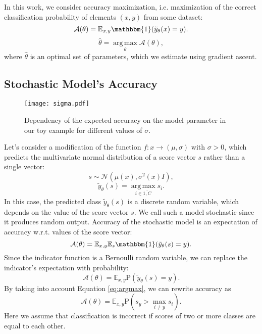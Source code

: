 \documentclass[nohyperref]{article}
\DeclareMathOperator*{\argmax}{arg\,max}
\theoremstyle{plain}
\theoremstyle{definition}
\theoremstyle{remark}
\begin{document}
In this work, we consider accuracy maximization, i.e. maximization of the correct classification probability of elements $(x, y)$ from some dataset:
\begin{equation}
    \mathcal{A}(\theta) = \mathbb{E}_{x, y}\mathbbm{1}(\tilde{y}_\theta(x) = y).
\end{equation}
\begin{equation}
    \hat{\theta} = \argmax\limits_\theta \mathcal{A}(\theta),
\end{equation}
where $\hat{\theta}$ is an optimal set of parameters, which we estimate using gradient ascent.

\subsection{Stochastic Model's Accuracy}


\begin{figure}[t]
\vskip 0.1in
\centering
\texttt{[image: sigma.pdf]}
\caption{Dependency of the expected accuracy on the model parameter in our toy example for different values of $\sigma$.}
\label{fig:sigma}
\vskip -0.1in
\end{figure}

Let's consider a modification of the function $f: x \rightarrow (\mu, \sigma)$ with $\sigma > 0$, which predicts the multivariate normal distribution of a score vector $s$ rather than a single vector:
\begin{equation}
    s \sim \mathcal{N}(\mu(x), \sigma^2(x) I),
    \label{eq:scores-distribution}
\end{equation}
\begin{equation}
    \tilde{y}_\theta(s) = \argmax\limits_{i \in \overline{1, C}} s_i.
    \label{eq:argmax}
\end{equation}
In this case, the predicted class $\tilde{y}_\theta(s)$ is a discrete random variable, which depends on the value of the score vector $s$. We call such a model stochastic since it produces random output. Accuracy of the stochastic model is an expectation of accuracy w.r.t. values of the score vector:
\begin{equation}
    \mathcal{A}(\theta) = \mathbb{E}_{x, y}\mathbb{E}_{s}\mathbbm{1}(\tilde{y}_\theta(s) = y).
\end{equation}
Since the indicator function is a Bernoulli random variable, we can replace the indicator's expectation with probability:
\begin{equation}
    \mathcal{A}(\theta) =  \mathbb{E}_{x, y}\mathrm{P}(\tilde{y}_\theta(s) = y).
\end{equation}
By taking into account Equation \ref{eq:argmax}, we can rewrite accuracy as
\begin{equation}
    \mathcal{A}(\theta)
    = \mathbb{E}_{x, y}\mathrm{P}(s_y > \max\limits_{i \ne y}s_i).
    \label{eq:total-accuracy}
\end{equation}
Here we assume that classification is incorrect if scores of two or more classes are equal to each other.
\end{document}
